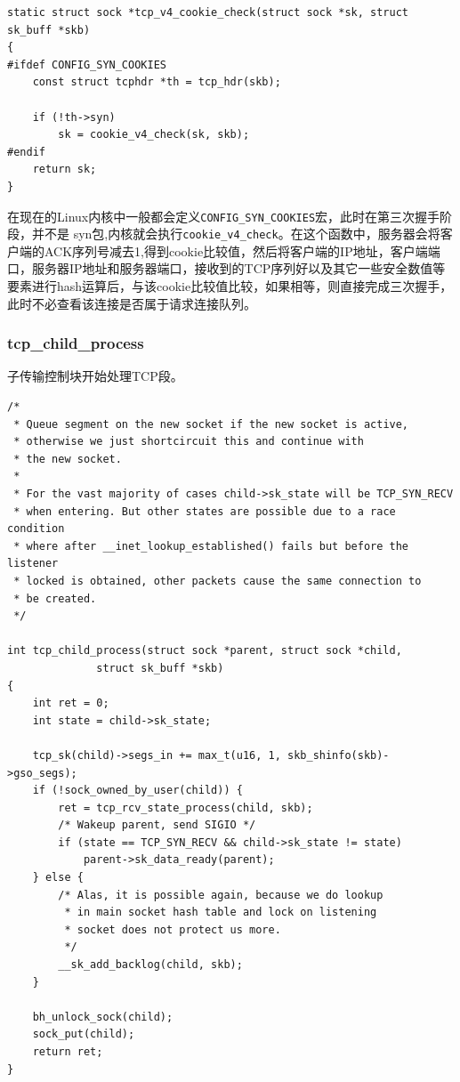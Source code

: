 \begin{verbatim}
static struct sock *tcp_v4_cookie_check(struct sock *sk, struct sk_buff *skb)
{
#ifdef CONFIG_SYN_COOKIES
    const struct tcphdr *th = tcp_hdr(skb);

    if (!th->syn)
        sk = cookie_v4_check(sk, skb);
#endif
    return sk;
}
\end{verbatim}

                    在现在的Linux内核中一般都会定义\texttt{CONFIG_SYN_COOKIES}宏，此时在第三次握手阶段，并不是 syn包,内核就会执行\texttt{cookie_v4_check}。在这个函数中，服务器会将客户端的ACK序列号减去1,得到cookie比较值，然后将客户端的IP地址，客户端端口，服务器IP地址和服务器端口，接收到的TCP序列好以及其它一些安全数值等要素进行hash运算后，与该cookie比较值比较，如果相等，则直接完成三次握手，此时不必查看该连接是否属于请求连接队列。

                \subsubsection{tcp\_child\_process}

                    子传输控制块开始处理TCP段。
\begin{verbatim}
/*
 * Queue segment on the new socket if the new socket is active,
 * otherwise we just shortcircuit this and continue with
 * the new socket.
 *
 * For the vast majority of cases child->sk_state will be TCP_SYN_RECV
 * when entering. But other states are possible due to a race condition
 * where after __inet_lookup_established() fails but before the listener
 * locked is obtained, other packets cause the same connection to
 * be created.
 */

int tcp_child_process(struct sock *parent, struct sock *child,
              struct sk_buff *skb)
{
    int ret = 0;
    int state = child->sk_state;

    tcp_sk(child)->segs_in += max_t(u16, 1, skb_shinfo(skb)->gso_segs);
    if (!sock_owned_by_user(child)) {
        ret = tcp_rcv_state_process(child, skb);
        /* Wakeup parent, send SIGIO */
        if (state == TCP_SYN_RECV && child->sk_state != state)
            parent->sk_data_ready(parent);
    } else {
        /* Alas, it is possible again, because we do lookup
         * in main socket hash table and lock on listening
         * socket does not protect us more.
         */
        __sk_add_backlog(child, skb);
    }

    bh_unlock_sock(child);
    sock_put(child);
    return ret;
}
\end{verbatim}

